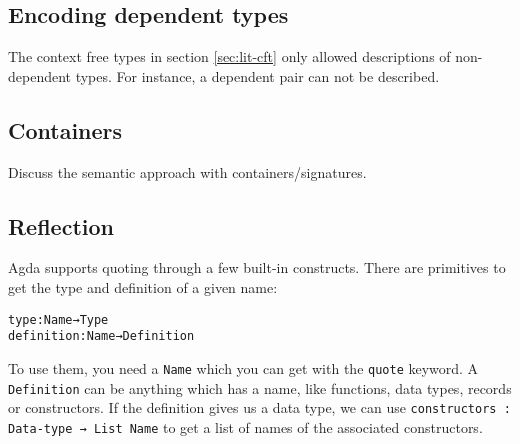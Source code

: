\subsection{Encoding dependent types}

The context free types in section \ref{sec:lit-cft} only allowed
descriptions of non-dependent types.
For instance, a dependent pair can not be described.







\subsection{Containers}

Discuss the semantic approach with containers/signatures.

\subsection{Reflection}\label{sec:lit-reflection}

Agda supports quoting through a few built-in constructs.
There are primitives to get the type and definition of a given name:

\begin{alltt}
type         : Name → Type
definition   : Name → Definition
\end{alltt}

To use them, you need a \texttt{Name} which you can get with the
\texttt{quote} keyword.
A \texttt{Definition} can be anything which has a name, like
functions, data types, records or constructors.
If the definition gives us a data type, we can use 
\texttt{constructors : Data-type → List Name} to get a list of names
of the associated constructors.



